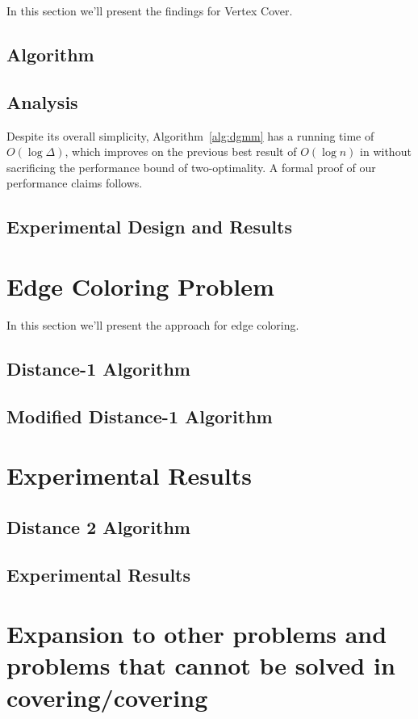 \documentclass[twoside]{article}
\begin{document}
In this section we'll present the findings for Vertex Cover.

\subsection{Algorithm}


\subsection{Analysis}

\label{ssb:algorithms-dgmm-performance}

Despite its overall simplicity, Algorithm~\ref{alg:dgmm} has a running time of $O(\log \Delta)$, which improves on the previous best result of $O(\log n)$ in \cite{1582746} without sacrificing the performance bound of two-optimality. A formal proof of our performance claims follows.



\subsection{Experimental Design and Results}



\section{Edge Coloring Problem}

In this section we'll present the approach for edge coloring.

\subsection{Distance-1 Algorithm}

\subsection{Modified Distance-1 Algorithm}


\section{Experimental Results}


\subsection{Distance 2 Algorithm}
\subsection{Experimental Results}

\section{Expansion to other problems and problems that cannot be solved in covering/covering}



\end{document}
